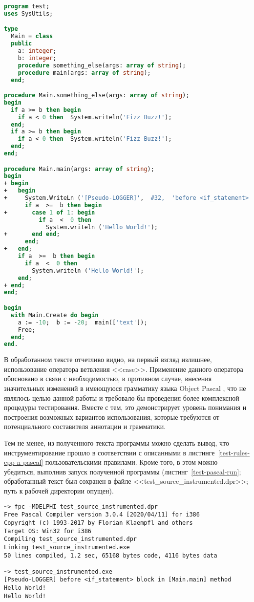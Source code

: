 \begin{lstlisting}[frame=single, language=Pascal, label={test-pascal-result}, caption={Текст инструментированного тестового приложения.}]
program test;
uses SysUtils;

type
  Main = class
  public
    a: integer;
    b: integer;
    procedure something_else(args: array of string);
    procedure main(args: array of string);
  end;

procedure Main.something_else(args: array of string);
begin
  if a >= b then begin
    if a < 0 then  System.writeln('Fizz Buzz!');
  end;
  if a >= b then begin
    if a < 0 then  System.writeln('Fizz Buzz!');
  end;
end;

procedure Main.main(args: array of string);
begin
+ begin
+   begin
+     System.WriteLn ('[Pseudo-LOGGER]',  #32,  'before <if_statement> block in [Main.main] method');
      if a  >=  b then begin
+       case 1 of 1: begin
          if a  <  0 then
            System.writeln ('Hello World!');
+       end end;
      end;
+   end;
    if a  >=  b then begin
      if a  <  0 then
        System.writeln ('Hello World!');
    end;
+ end;
end;

begin
  with Main.Create do begin
    a := -10;  b := -20;  main(['text']);
    Free;
  end;
end.
\end{lstlisting}

В обработанном тексте отчетливо видно, на первый взгляд излишнее, использование оператора ветвления <<case>>.
Применение данного оператора обосновано в связи с необходимостью, в противном случае, внесения значительных изменений в имеющуюся грамматику языка Object Pascal \cite{txl-resources}, что не являлось целью данной работы и требовало бы проведения более комплексной процедуры тестирования.
Вместе с тем, это демонстрирует уровень понимания и построения возможных вариантов использования, которые требуются от потенциального составителя аннотации и грамматики.

Тем не менее, из полученного текста программы можно сделать вывод, что инструментирование прошло в соответствии с описанными в листинге~\ref{test-rules-cpp-n-pascal} пользовательскими правилами. Кроме того, в этом можно убедиться, выполнив запуск полученной программы (листинг~\ref{test-pascal-run}; обработанный текст был сохранен в файле <<test\_source\_instrumented.dpr>>; путь к рабочей директории опущен).

\begin{lstlisting}[frame=single, label={test-pascal-run}, caption={Результаты сборки и запуска обработанного тестового приложения.}]
~> fpc -MDELPHI test_source_instrumented.dpr
Free Pascal Compiler version 3.0.4 [2020/04/11] for i386
Copyright (c) 1993-2017 by Florian Klaempfl and others
Target OS: Win32 for i386
Compiling test_source_instrumented.dpr
Linking test_source_instrumented.exe
50 lines compiled, 1.2 sec, 65168 bytes code, 4116 bytes data

~> test_source_instrumented.exe
[Pseudo-LOGGER] before <if_statement> block in [Main.main] method
Hello World!
Hello World!
\end{lstlisting}

